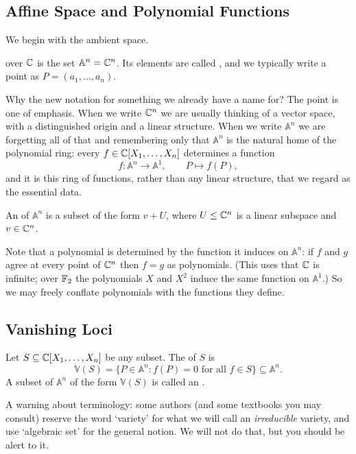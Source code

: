 \documentclass[a4paper]{scrartcl}
\newcommand{\A}{\mathbb{A}}
\newcommand{\V}{\mathbb{V}}
\begin{document}
\subsection{Affine Space and Polynomial Functions}

We begin with the ambient space.

\begin{definition}
	 over $\mathbb{C}$ is the set $\A^n = \C^n$. Its elements are called , and we typically write a point as $P = (a_1,\dots,a_n)$.
\end{definition}

Why the new notation for something we already have a name for? The point is one of emphasis. When we write $\mathbb{C}^n$ we are usually thinking of a vector space, with a distinguished origin and a linear structure. When we write $\A^n$ we are forgetting all of that and remembering only that $\A^n$ is the natural home of the polynomial ring: every $f \in \mathbb{C}[X_1,\dots,X_n]$ determines a function
$$f \colon \A^n \to \A^1, \qquad P \mapsto f(P),$$
and it is this ring of functions, rather than any linear structure, that we regard as the essential data.

\begin{definition}
	An  of $\A^n$ is a subset of the form $v + U$, where $U \leq \mathbb{C}^n$ is a linear subspace and $v \in \mathbb{C}^n$.
\end{definition}

Note that a polynomial is determined by the function it induces on $\A^n$: if $f$ and $g$ agree at every point of $\mathbb{C}^n$ then $f = g$ as polynomials. (This uses that $\mathbb{C}$ is infinite; over $\mathbb{F}_2$ the polynomials $X$ and $X^2$ induce the same function on $\A^1$.) So we may freely conflate polynomials with the functions they define.

\subsection{Vanishing Loci}

\begin{definition}
	Let $S \subseteq \mathbb{C}[X_1,\dots,X_n]$ be any subset. The  of $S$ is
	$$\V(S) = \{P \in \A^n : f(P) = 0 \text{ for all } f \in S\} \subseteq \A^n.$$
	A subset of $\A^n$ of the form $\V(S)$ is called an .
\end{definition}

A warning about terminology: some authors (and some textbooks you may consult) reserve the word `variety' for what we will call an \emph{irreducible} variety, and use `algebraic set' for the general notion. We will not do that, but you should be alert to it.
\end{document}
